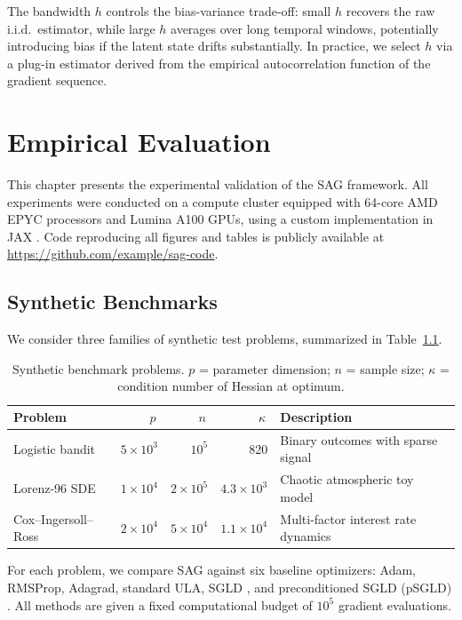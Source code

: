 \documentclass[12pt,letterpaper,twoside]{report}
\begin{document}
\vspace{6pt}

The bandwidth $h$ controls the bias-variance trade-off: small $h$ recovers the raw i.i.d.\ estimator, while large $h$ averages over long temporal windows, potentially introducing bias if the latent state drifts substantially. In practice, we select $h$ via a plug-in estimator derived from the empirical autocorrelation function of the gradient sequence.

\chapter{Empirical Evaluation}

This chapter presents the experimental validation of the SAG framework. All experiments were conducted on a compute cluster equipped with 64-core AMD EPYC processors and Lumina A100 GPUs, using a custom implementation in JAX \cite{jax2018}. Code reproducing all figures and tables is publicly available at \url{https://github.com/example/sag-code}.

\section{Synthetic Benchmarks}

We consider three families of synthetic test problems, summarized in Table~\ref{tab:benchmarks}.

\begin{table}[htbp]
\centering
\caption{Synthetic benchmark problems. $p$ = parameter dimension; $n$ = sample size; $\kappa$ = condition number of Hessian at optimum.}
\label{tab:benchmarks}
\begin{tabularx}{0.92\textwidth}{lrrrX}
\toprule
\textbf{Problem} & \textbf{\,$p$\,} & \textbf{\,$n$\,} & \textbf{\,$\kappa$\,} & \textbf{Description} \\
\midrule
Logistic bandit & $5\times 10^{3}$ & $10^{5}$ & 820 & Binary outcomes with sparse signal \\
Lorenz-96 SDE & $1\times 10^{4}$ & $2\times 10^{5}$ & $4.3\times 10^{3}$ & Chaotic atmospheric toy model \\
Cox--Ingersoll--Ross & $2\times 10^{4}$ & $5\times 10^{4}$ & $1.1\times 10^{4}$ & Multi-factor interest rate dynamics \\
\bottomrule
\end{tabularx}
\end{table}

\noindent For each problem, we compare SAG against six baseline optimizers: Adam, RMSProp, Adagrad, standard ULA, SGLD \cite{welling2011}, and preconditioned SGLD (pSGLD) \cite{ahn2012}. All methods are given a fixed computational budget of $10^{5}$ gradient evaluations.
\end{document}
